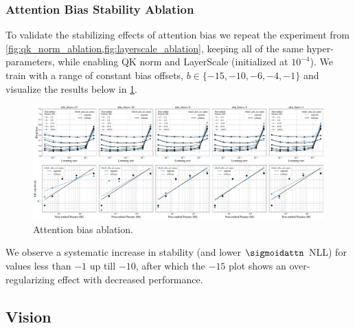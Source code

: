 \subsubsection{Attention Bias Stability Ablation}
\label{sec:attn_bias_ablation}
To validate the stabilizing effects of attention bias we repeat the experiment from \cref{fig:qk_norm_ablation,fig:layerscale_ablation}, keeping all of the same hyper-parameters, while enabling QK norm and LayerScale (initialized at $10^{-4}$). We train with a range of constant bias offsets, $b \in \{-15, -10, -6, -4, -1 \}$ and visualize the results below in \cref{fig:const_attn_bias_ablation}.
\begin{figure}[htbp]
    \centering
    \includegraphics[width=\textwidth]{figures/lines=activation-cols=bias.pdf}
    \captionsetup{justification=centering}
    \caption{Attention bias ablation.}
    \label{fig:const_attn_bias_ablation}
\end{figure}
We observe a systematic increase in stability (and lower $\sigmoidattn$ NLL) for values less than $-1$ up till $-10$, after which the $-15$ plot shows an over-regularizing effect with decreased performance.
\subsection{Vision}
\label{app:vision}
